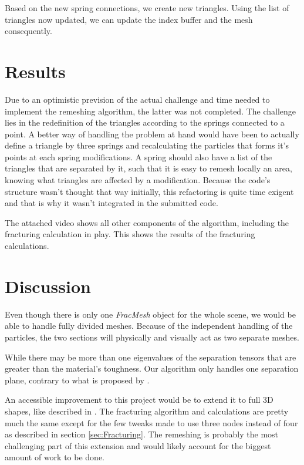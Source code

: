 \documentclass[tog]{acmsiggraph}
\begin{document}
Based on the new spring connections, we create new triangles. Using the list of triangles now updated, we can update the index buffer and the mesh consequently. 

\section{Results}
Due to an optimistic prevision of the actual challenge and time needed to implement the remeshing algorithm, the latter was not completed. The challenge lies in the redefinition of the triangles according to the springs connected to a point. A better way of handling the problem at hand would have been to actually define a triangle by three springs and recalculating the particles that forms it's points at each spring modifications. A spring should also have a list of the triangles that are separated by it, such that it is easy to remesh locally an area, knowing what triangles are affected by a modification. Because the code's structure wasn't thought that way initially, this refactoring is quite time exigent and that is why it wasn't integrated in the submitted code. 

The attached video shows all other components of the algorithm, including the fracturing calculation in play. This shows the results of the fracturing calculations. 

\section{Discussion}
Even though there is only one \textit{FracMesh} object for the whole scene, we would be able to handle fully divided meshes. Because of the independent handling of the particles, the two sections will physically and visually act as two separate meshes. 

While there may be more than one eigenvalues of the separation tensors that are greater than the material's toughness. Our algorithm only handles one separation plane, contrary to what is proposed by \cite{Obrien:1999:GMA}.

An accessible improvement to this project would be to extend it to full 3D shapes, like described in \cite{Obrien:1999:GMA}. The fracturing algorithm and calculations are pretty much the same except for the few tweaks made to use three nodes instead of four as described in section \ref{sec:Fracturing}. The remeshing is probably the most challenging part of this extension and would likely account for the biggest amount of work to be done. 
\end{document}
